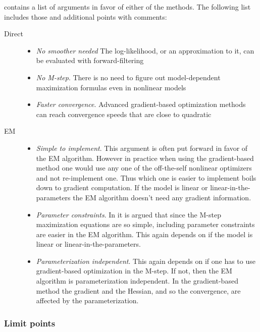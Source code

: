 \textcite{Cappe2005} contains a list of arguments in favor of either of the methods. The following list includes
those and additional points with comments:
\begin{description}
  \item[Direct]\hfill
\begin{itemize}
  \item\emph{No smoother needed} The log-likelihood, or an approximation to it, can be evaluated
  with forward-filtering
  \item\emph{No M-step}. There is no need to figure out model-dependent maximization
  formulas even in nonlinear models 
  \item\emph{Faster convergence}. Advanced gradient-based optimization
  methods can reach convergence speeds that are close to quadratic
\end{itemize}
  \item[EM]\hfill
  \begin{itemize}
  \item \emph{Simple to implement}. This argument is often put forward in favor of the EM
 algorithm. However in practice when using the gradient-based method one would use any one of
the off-the-self nonlinear optimizers and not re-implement one. Thus which one is easier to implement
boils down to gradient computation. If the model is linear or linear-in-the-parameters the EM
algorithm doesn't need any gradient information.
  \item\emph{Parameter constraints}. In \textcite{Cappe2005} it is argued that
since the M-step maximization equations are so simple, including parameter constraints
are easier in the EM algorithm. This again depends on if the model is linear or linear-in-the-parameters.
  \item\emph{Parameterization independent}. This again depends on if one has to use gradient-based
 optimization in the M-step. If not, then the EM algorithm is parameterization independent. In the gradient-based
 method the gradient and the Hessian, and so the convergence, are affected by the parameterization.
\end{itemize} 
\end{description}
 

\subsubsection{Limit points}

